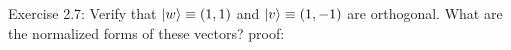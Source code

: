 \begin{flushleft}
{\Large Exercise 2.7:}
Verify that $\ket{w} \equiv (1, 1)$ and $\ket{v} \equiv (1, -1)$ are orthogonal.
What are the normalized forms of these vectors?
\newline
\vspace{0.2in}
{\large proof:}

\end{flushleft}
